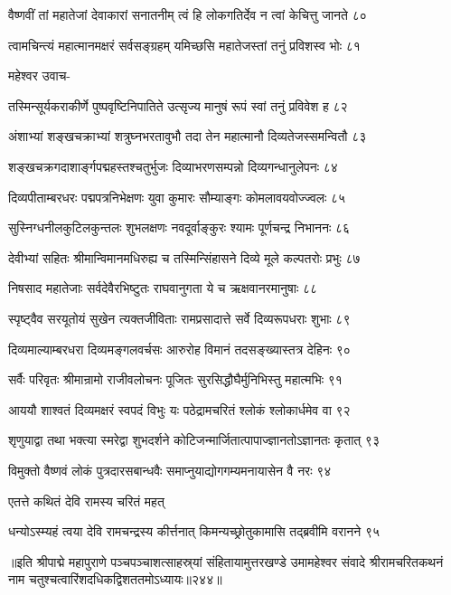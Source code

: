 वैष्णवीं तां महातेजां देवाकारां सनातनीम्
त्वं हि लोकगतिर्देव न त्वां केचित्तु जानते ८०

त्वामचिन्त्यं महात्मानमक्षरं सर्वसङ्ग्रहम्
यमिच्छसि महातेजस्तां तनुं प्रविशस्व भोः ८१

महेश्वर उवाच-

तस्मिन्सूर्यकराकीर्णे पुष्पवृष्टिनिपातिते
उत्सृज्य मानुषं रूपं स्वां तनुं प्रविवेश ह ८२

अंशाभ्यां शङ्खचक्राभ्यां शत्रुघ्नभरतावुभौ
तदा तेन महात्मानौ दिव्यतेजस्समन्वितौ ८३

शङ्खचक्रगदाशार्ङ्गपद्महस्तश्चतुर्भुजः
दिव्याभरणसम्पन्नो दिव्यगन्धानुलेपनः ८४

दिव्यपीताम्बरधरः पद्मपत्रनिभेक्षणः
युवा कुमारः सौम्याङ्गः कोमलावयवोज्ज्वलः ८५

सुस्निग्धनीलकुटिलकुन्तलः शुभलक्षणः
नवदूर्वाङ्कुरः श्यामः पूर्णचन्द्र निभाननः ८६

देवीभ्यां सहितः श्रीमान्विमानमधिरुह्य च
तस्मिन्सिंहासने दिव्ये मूले कल्पतरोः प्रभुः ८७

निषसाद महातेजाः सर्वदेवैरभिष्टुतः
राघवानुगता ये च ऋक्षवानरमानुषाः ८८

स्पृष्ट्वैव सरयूतोयं सुखेन त्यक्तजीविताः
रामप्रसादात्ते सर्वे दिव्यरूपधराः शुभाः ८९

दिव्यमाल्याम्बरधरा दिव्यमङ्गलवर्चसः
आरुरोह विमानं तदसङ्ख्यास्तत्र देहिनः ९०

सर्वैः परिवृतः श्रीमान्रामो राजीवलोचनः
पूजितः सुरसिद्धौघैर्मुनिभिस्तु महात्मभिः ९१

आययौ शाश्वतं दिव्यमक्षरं स्वपदं विभुः
यः पठेद्रामचरितं श्लोकं श्लोकार्धमेव वा ९२

शृणुयाद्वा तथा भक्त्या स्मरेद्वा शुभदर्शने
कोटिजन्मार्जितात्पापाज्ज्ञानतोऽज्ञानतः कृतात् ९३

विमुक्तो वैष्णवं लोकं पुत्रदारसबान्धवैः
समाप्नुयाद्योगगम्यमनायासेन वै नरः ९४

एतत्ते कथितं देवि रामस्य चरितं महत्

धन्योऽस्म्यहं त्वया देवि रामचन्द्रस्य कीर्त्तनात्
किमन्यच्छ्रोतुकामासि तद्ब्रवीमि वरानने ९५

॥इति श्रीपाद्मे महापुराणे पञ्चपञ्चाशत्साहस्र्यां संहितायामुत्तरखण्डे उमामहेश्वर संवादे श्रीरामचरितकथनं नाम चतुश्चत्वारिंशदधिकद्विशततमोऽध्यायः॥२४४॥


